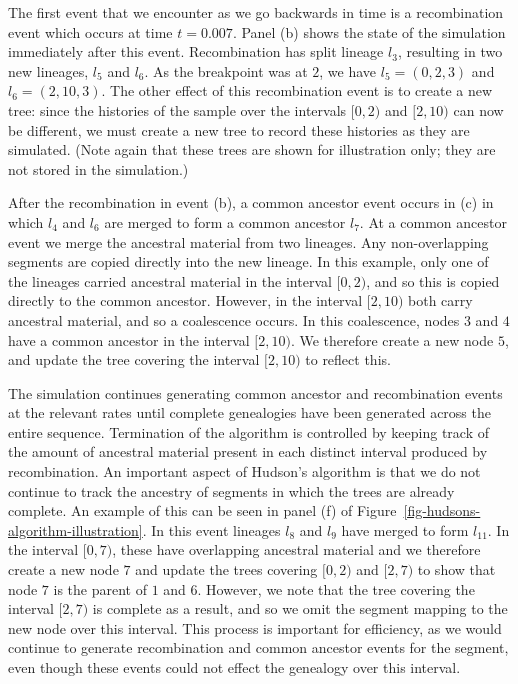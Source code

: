 \documentclass[10pt]{article}
\begin{document}
The first event that we encounter as we go backwards in time is a recombination
event which occurs at time $t=0.007$. Panel (b) shows the state of the
simulation immediately after this event. Recombination has split lineage $l_3$,
resulting in two new lineages, $l_5$ and $l_6$.  As the breakpoint was at
$2$, we have $l_5 = (0, 2, 3)$ and $l_6 = (2, 10, 3)$. The other
effect of this recombination event is to create a new tree: since the histories
of the sample over the intervals $[0, 2)$ and $[2, 10)$ can now be different,
we must create a new tree to record these histories as they are simulated.
(Note again that these trees are shown for illustration only; they are not stored
in the simulation.)

After the recombination in event (b), a common ancestor event occurs in (c) in which
$l_4$ and $l_6$ are merged to form a common ancestor $l_7$.  At a common ancestor
event we merge the ancestral material from two lineages. Any non-overlapping
segments are copied directly into the new lineage. In this example, only one of
the lineages carried ancestral material in the interval $[0, 2)$, and so this
is copied directly to the common ancestor. However, in the interval $[2, 10)$
both carry ancestral material, and so a coalescence occurs.  In this
coalescence, nodes $3$ and $4$ have a common ancestor in the interval $[2,
10)$. We therefore create a new node $5$, and update the tree covering the
interval $[2, 10)$ to reflect this.

The simulation continues generating common ancestor and recombination events at the
relevant rates until complete genealogies have been generated across the
entire sequence. Termination of the algorithm is controlled by keeping track of
the amount of ancestral material present in each distinct interval produced by
recombination. An important aspect of Hudson's algorithm is that we do not
continue to track the ancestry of segments in which the trees are already
complete. An example of this can be seen in panel (f) of
Figure~\ref{fig-hudsons-algorithm-illustration}.  In this event lineages $l_8$ and
$l_9$ have merged to form $l_{11}$. In the interval $[0, 7)$, these have overlapping
ancestral material and we therefore create a new node $7$ and update the trees
covering $[0, 2)$ and $[2, 7)$ to show that node $7$ is the parent of $1$ and
$6$. However, we note that the tree covering the interval $[2, 7)$ is complete
as a result, and so we omit the segment mapping to the new node over
this interval. This process is important for efficiency, as we would
continue to generate recombination and common ancestor events for the segment,
even though these events could not effect the genealogy over this interval.
\end{document}

